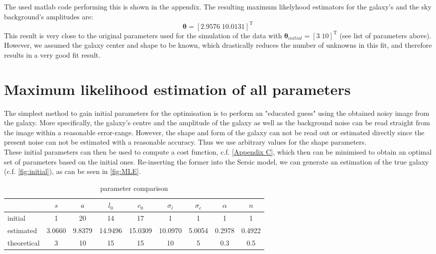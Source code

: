 The used matlab code performing this is shown in the appendix. The resulting maximum likelyhood estimators for the galaxy's and the sky background's amplitudes are:
\begin{equation*}
\boldsymbol{\theta}=\left[2.9576\;10.0131 \right]^{\mathrm{T}}
\end{equation*}
This result is very close to the original parameters used for the simulation of the data with $ \boldsymbol{\theta}_{initial}=\left[3\;10 \right]^{\mathrm{T}}$ (see list of parameters above). However, we assumed the galaxy center and shape to be known, which drastically reduces the number of unknowns in this fit, and therefore results in a very good fit result.

\section{Maximum likelihood estimation of all parameters}





The simplest method to gain initial parameters for the optimisation is to perform an "educated guess"  using the obtained noisy image from the galaxy. More specifically, the galaxy's centre and the amplitude of the galaxy as well as the background noise can be read straight from the image within a reasonable error-range. However, the shape and form of the galaxy can not be read out or estimated directly since the present noise can not be estimated with a reasonable accuracy. Thus we use arbitrary values for the shape parameters.\\
These initial parameters can then be used to compute a cost function, c.f. \cref{Appendix C}, which then can be minimised to obtain an optimal set of parameters based on the initial ones. Re-inserting the former into the Sersic model, we can generate an estimation of the true galaxy (c.f. \cref{fig:initial}), as can be seen in \cref{fig:MLE}.


\begin{table}[h!]
\centering
\begin{tabular}{ l | c c c c c c c c}
	& $s$ & $a$ & $l_0$ & $c_0$ & $\sigma_l$ & $\sigma_c$ & $\alpha$ & $n$ \\
	\hline
	initial & 1 & 20 & 14 & 17 & 1 & 1 & 1 & 1 \\
	estimated & 3.0660 & 9.8379 & 14.9496 & 15.0309 & 10.0970 & 5.0054 & 0.2978 & 0.4922 \\
	theoretical & 3 & 10 & 15 & 15 & 10 & 5 & 0.3 & 0.5
\end{tabular}
\caption{parameter comparison}
\label{tab:param}
\end{table}

